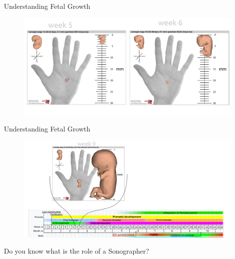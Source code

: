 {
\begin{frame}{Understanding Fetal Growth}
      \begin{figure}
        \centering
        \includegraphics[width=1.0\textwidth]{./figures/fetal-size/versions/drawing-v01.png}
      \end{figure}
\end{frame}
}




{
\begin{frame}{Understanding Fetal Growth}
      \begin{figure}
        \centering
        \includegraphics[width=1.0\textwidth]{./figures/fetal-size/versions/drawing-v02.png}
      \end{figure}
\end{frame}
}


{
\begin{frame}{}

\BigSizeFont
Do you know what is the role of a Sonographer?
\end{frame}
}



